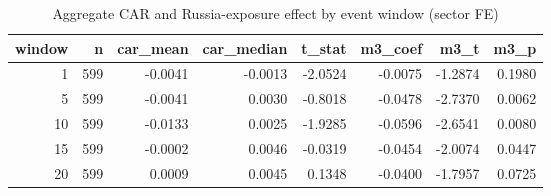 \begin{table}
\caption{Aggregate CAR and Russia-exposure effect by event window (sector FE)}
\label{tab:window_ladder}
\begin{tabular}{rrrrrrrr}
\toprule
window & n & car_mean & car_median & t_stat & m3_coef & m3_t & m3_p \\
\midrule
1 & 599 & -0.0041 & -0.0013 & -2.0524 & -0.0075 & -1.2874 & 0.1980 \\
5 & 599 & -0.0041 & 0.0030 & -0.8018 & -0.0478 & -2.7370 & 0.0062 \\
10 & 599 & -0.0133 & 0.0025 & -1.9285 & -0.0596 & -2.6541 & 0.0080 \\
15 & 599 & -0.0002 & 0.0046 & -0.0319 & -0.0454 & -2.0074 & 0.0447 \\
20 & 599 & 0.0009 & 0.0045 & 0.1348 & -0.0400 & -1.7957 & 0.0725 \\
\bottomrule
\end{tabular}
\end{table}
